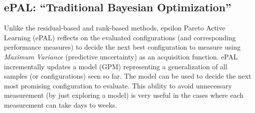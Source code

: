 \subsection{ePAL: ``Traditional Bayesian Optimization''}\label{sec:epal}

Unlike the residual-based and rank-based methods, epsilon Pareto Active Learning (ePAL) reflects on the evaluated configurations (and corresponding performance measures) to decide the next best configuration to measure using \textit{Maximum Variance} (predictive uncertainty) as an acquisition function.   ePAL incrementally updates a  model (GPM) representing a generalization
of all samples (or configurations) seen so far. 
The model can be used to decide the next most promising configuration to evaluate.  This ability to avoid unnecessary measurement (by just exploring a model)
is very useful in the cases where each measurement can take days to weeks. 



